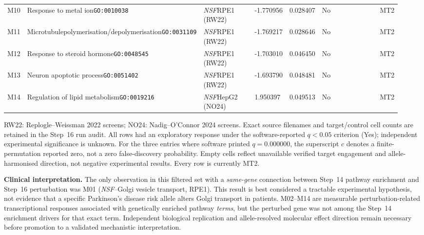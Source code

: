 \documentclass[11pt,a4paper]{article}
\begin{document}
\begin{landscape}
\begin{longtable}{@{}Y{0.045\linewidth}Y{0.240\linewidth}Y{0.170\linewidth}Y{0.077\linewidth}Y{0.080\linewidth}Y{0.083\linewidth}Y{0.094\linewidth}Y{0.099\linewidth}Y{0.053\linewidth}@{}}
M10 & Response to metal ion\newline\texttt{GO:0010038} & \textit{NSF}\newline RPE1 (RW22) & -1.770956 & 0.028407 & No &  &  & MT2 \\
M11 & Microtubule\newline polymerisation/\allowbreak depolymerisation\newline\texttt{GO:0031109} & \textit{NSF}\newline RPE1 (RW22) & -1.769217 & 0.028646 & No &  &  & MT2 \\
M12 & Response to steroid hormone\newline\texttt{GO:0048545} & \textit{NSF}\newline RPE1 (RW22) & -1.703010 & 0.046450 & No &  &  & MT2 \\
M13 & Neuron apoptotic process\newline\texttt{GO:0051402} & \textit{NSF}\newline RPE1 (RW22) & -1.693790 & 0.048481 & No &  &  & MT2 \\
M14 & Regulation of lipid metabolism\newline\texttt{GO:0019216} & \textit{NSF}\newline HepG2 (NO24) & 1.950397 & 0.049513 & No &  &  & MT2 \\
\end{longtable}
\noindent\footnotesize
RW22: Replogle--Weissman 2022 screens; NO24: Nadig--O'Connor 2024 screens. Exact source filenames and target/control cell counts are retained in the Step~16 run audit. All rows had an exploratory response under the software-reported $q<0.05$ criterion (Yes); independent experimental significance is unknown. For the three entries where software printed $q=0.000000$, the superscript $c$ denotes a finite-permutation reported zero, not a zero false-discovery probability. Empty cells reflect unavailable verified target engagement and allele-harmonised direction, not negative experimental results. Every row is currently MT2.\par
\endgroup\end{landscape}

\noindent\textbf{Clinical interpretation.}
The only observation in this filtered set with a \emph{same-gene}
connection between Step~14 pathway enrichment and Step~16 perturbation
was M01 (\textit{NSF}--Golgi vesicle transport, RPE1). This result is
best considered a tractable experimental hypothesis, not evidence that
a specific Parkinson's disease risk allele alters Golgi transport in
patients. M02--M14 are measurable perturbation-related transcriptional
responses associated with genetically enriched pathway \emph{terms},
but the perturbed gene was not among the Step~14 enrichment drivers for
that exact term. Independent biological replication and allele-resolved
molecular effect direction remain necessary before promotion to a
validated mechanistic interpretation.
\end{document}
